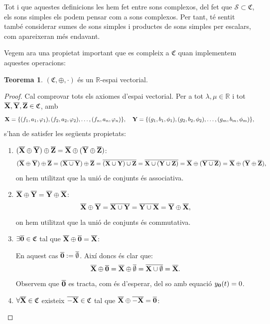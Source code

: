 \documentclass{article}
\theoremstyle{definition}
\newtheorem{theorem}[definition]{Teorema}
\newcommand{\0}{\ensuremath{\vb{0}}}
\newcommand{\X}{\ensuremath{\vb{X}}}
\newcommand{\Y}{\ensuremath{\vb{Y}}}
\newcommand{\Z}{\ensuremath{\vb{Z}}}
\newcommand{\RR}{\ensuremath{\mathbb{R}}} %
\begin{document}
Tot i que aquestes definicions les hem fet entre sons complexos, del fet que $\mathcal{S}\subset\mathfrak{C}$, els sons simples els podem pensar com a sons complexos. Per tant, té sentit també considerar sumes de sons simples i productes de sons simples per escalars, com apareixeran més endavant.\par
Vegem ara una propietat important que es compleix a $\mathfrak{C}$ quan implementem aquestes operacions:
\begin{theorem}
    $(\mathfrak{C},\oplus,\cdot)$ és un $\RR$-espai vectorial.
\end{theorem}
\begin{proof}
    Cal comprovar tots els axiomes d'espai vectorial. Per a tot $\lambda,\mu\in\RR$ i tot $\overline{\X},\overline{\Y},\overline{\Z}\in\mathfrak{C}$, amb $$\X=\{(f_1,a_1,\varphi_1),(f_2,a_2,\varphi_2),\ldots,(f_n,a_n,\varphi_n)\},\quad\Y=\{(g_1,b_1,\phi_1),(g_2,b_2,\phi_2),\ldots,(g_m,b_m,\phi_m)\},$$  s'han de satisfer les següents propietats:
    \begin{enumerate}
        \item $(\overline{\X}\oplus \overline{\Y})\oplus \overline{\Z}=\overline{\X}\oplus (\overline{\Y}\oplus \overline{\Z})$:
        $$(\overline{\X}\oplus \overline{\Y})\oplus \overline{\Z}=(\overline{\X\cup\Y})\oplus \overline{\Z}=\overline{(\X\cup\Y)\cup\Z}=\overline{\X\cup(\Y\cup\Z)}=\overline{\X}\oplus(\overline{\Y\cup\Z})=\overline{\X}\oplus (\overline{\Y}\oplus \overline{\Z}),$$ on hem utilitzat que la unió de conjunts és associativa.
        \item $\overline{\X}\oplus \overline{\Y}=\overline{\Y}\oplus \overline{\X}$:
        $$\overline{\X}\oplus \overline{\Y}=\overline{\X\cup\Y}=\overline{\Y\cup\X}=\overline{\Y}\oplus \overline{\X},$$ on hem utilitzat que la unió de conjunts és commutativa.
        \item $\exists \overline{\0}\in\mathfrak{C}$ tal que $\overline{\X}\oplus\overline{\0}=\overline{\X}$:\par
        En aquest cas $\overline{\0}:=\overline{\emptyset}$. Així doncs és clar que: $$\overline{\X}\oplus\overline{\0}=\overline{\X}\oplus\overline{\emptyset}=\overline{\X\cup\emptyset}=\overline{\X}.$$ Observem que $\overline{\0}$ es tracta, com és d'esperar, del so amb equació $y_{\0}(t)=0$.
        \item $\forall \overline{\X}\in\mathfrak{C}$ existeix $\overline{-\X}\in\mathfrak{C}$ tal que $\overline{\X}\oplus\overline{-\X}=\overline{\0}$:\par

\end{enumerate}
\end{proof}
\end{document}
